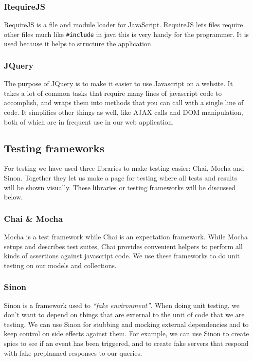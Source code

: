 \subsubsection{RequireJS}
RequireJS\cite{web_5} is a file and module loader for JavaScript. RequireJS lets files require other files much like \texttt{\#include} in java this is very handy for the programmer. It is used because it helps to structure the application.
\subsubsection{JQuery}
The purpose of JQuery\cite{web_6} is to make it easier to use Javascript on a website. It takes a lot of common tasks that require many lines of javascript code to accomplish, and wraps them into methods that you can call with a single line of code. It simplifies other things as well, like AJAX calls and DOM manipulation, both of which are in frequent use in our web application.
\subsection{Testing frameworks}
For testing we have used three libraries to make testing easier: Chai, Mocha and Sinon. Together they let us make a page for testing where all tests and results will be shown visually.
These libraries or testing frameworks will be discussed below.
\subsubsection{Chai \& Mocha}
Mocha\cite{web_8} is a test framework while Chai\cite{web_7} is an expectation framework. While Mocha setups and describes test suites, Chai provides convenient helpers to perform all kinds of assertions against javascript code. We use these frameworks to do unit testing on our models and collections.

\subsubsection{Sinon}
Sinon\cite{web_9} is a framework used to \textit{“fake environment”}. When doing unit testing, we don’t want to depend on things that are external to the unit of code that we are testing. We can use Sinon for stubbing and mocking external dependencies and to keep control on side effects against them. For example, we can use Sinon to create spies to see if an event has been triggered, and to create fake servers that respond with fake preplanned responses to our queries.

